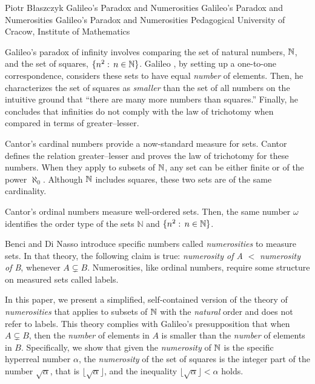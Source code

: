 \begin{artengenv}{Piotr Błaszczyk}
	{Galileo's Paradox and Numerosities}
	{Galileo's Paradox and Numerosities}
	{Galileo's Paradox and Numerosities}
	{Pedagogical University of Cracow, Institute of Mathematics}
	{Galileo's paradox of infinity involves comparing the set of natural numbers, ${\mathbb{N}}$, and the set of squares, $\{n^2:\, n\in{\mathbb{N}}\}$. Galileo \parencite*{ref_GG38},  by setting up a one-to-one correspondence, considers these sets  to have equal \textit{number} of elements. Then, he characterizes the set of squares as \textit{smaller} than the set of all numbers on the intuitive ground that ``there are many more numbers than squares.''  
	Finally, he concludes that infinities do not comply with the law of trichotomy when compared in terms of greater--lesser.
	
	Cantor's cardinal numbers provide a now-standard measure for sets. Cantor \parencites*{ref_C97}[Engl. transl.][]{ref_C15}  defines the relation greater--lesser and proves the law of trichotomy for these numbers. 
	When they apply to subsets of ${\mathbb{N}}$,   any set can be either finite or of the power $\aleph_0$. Although  ${\mathbb{N}}$  includes squares, these two sets are of the same cardinality.
	
	Cantor's ordinal numbers {measure}  well-ordered sets. Then, the same number $\omega$  identifies the order type of the sets  $\mathbb N$ and \mbox{$\{n^2:\, n\in{\mathbb{N}}\}$}.
	
	Benci and Di Nasso \parencite*{ref_BN19} introduce specific numbers called \textit{numerosities}  to  measure sets. In that theory,  the following claim is true: \textit{numerosity of A} $<$ \textit{numerosity of B}, whenever $A\subsetneq B$. Numerosities, like  ordinal numbers,  require some structure on measured sets called labels.
	
	In this paper, we present a simplified, self-contained version of the theory of \textit{numerosities} that applies to subsets of ${\mathbb{N}}$ with the \textit{natural} order and does not refer to labels. This theory complies with Galileo's presupposition that when $A\subsetneq B$, then
	the \textit{number} of  elements in $A$ is  smaller than the \textit{number}  of  elements in $B$. Specifically, we show that given the \textit{numerosity} of ${\mathbb{N}}$ is the specific hyperreal number $\alpha$, the \textit{numerosity} of the set of squares is the integer part of the number $\sqrt{\alpha}$, that is $\big\lfloor\sqrt{\alpha}\big\rfloor$, and  the inequality  $\big\lfloor\sqrt\alpha\big\rfloor<\alpha$ holds.
	
}
\end{artengenv}
